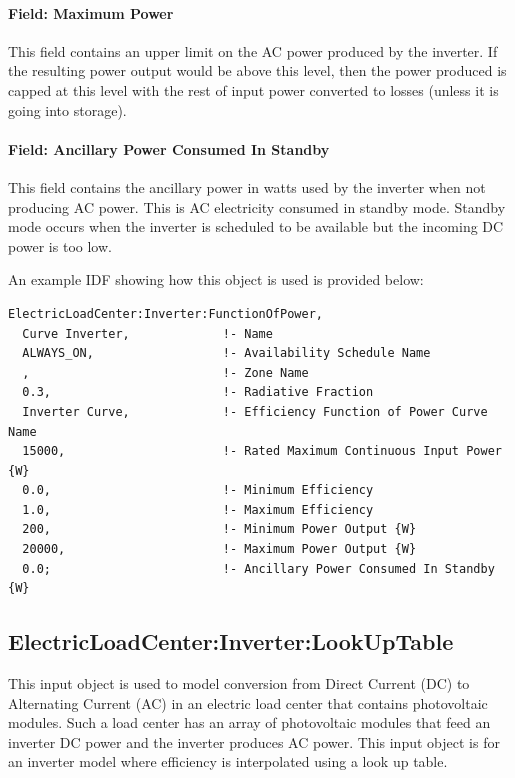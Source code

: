 \paragraph{Field: Maximum Power}\label{field-maximum-power}

This field contains an upper limit on the AC power produced by the inverter. If the resulting power output would be above this level, then the power produced is capped at this level with the rest of input power converted to losses (unless it is going into storage).

\paragraph{Field: Ancillary Power Consumed In Standby}\label{field-ancillary-power-consumed-in-standby}

This field contains the ancillary power in watts used by the inverter when not producing AC power. This is AC electricity consumed in standby mode. Standby mode occurs when the inverter is scheduled to be available but the incoming DC power is too low.

An example IDF showing how this object is used is provided below:

\begin{lstlisting}
ElectricLoadCenter:Inverter:FunctionOfPower,
  Curve Inverter,             !- Name
  ALWAYS_ON,                  !- Availability Schedule Name
  ,                           !- Zone Name
  0.3,                        !- Radiative Fraction
  Inverter Curve,             !- Efficiency Function of Power Curve Name
  15000,                      !- Rated Maximum Continuous Input Power {W}
  0.0,                        !- Minimum Efficiency
  1.0,                        !- Maximum Efficiency
  200,                        !- Minimum Power Output {W}
  20000,                      !- Maximum Power Output {W}
  0.0;                        !- Ancillary Power Consumed In Standby {W}
\end{lstlisting}

\subsection{ElectricLoadCenter:Inverter:LookUpTable}\label{electricloadcenterinverterlookuptable}

This input object is used to model conversion from Direct Current (DC) to Alternating Current (AC) in an electric load center that contains photovoltaic modules. Such a load center has an array of photovoltaic modules that feed an inverter DC power and the inverter produces AC power. This input object is for an inverter model where efficiency is interpolated using a look up table.

